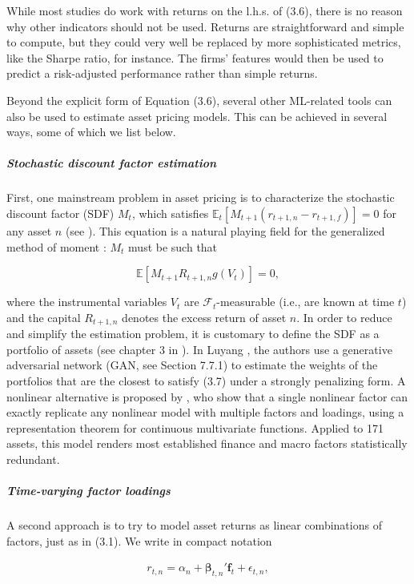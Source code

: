 While most studies do work with returns on the l.h.s. of (3.6), there is no reason why other indicators should not be used. Returns are straightforward and simple to compute, but they could very well be replaced by more sophisticated metrics, like the Sharpe ratio, for instance. The firms' features would then be used to predict a risk-adjusted performance rather than simple returns.

Beyond the explicit form of Equation (3.6), several other ML-related tools can also be used to estimate asset pricing models. This can be achieved in several ways, some of which we list below.

\subparagraph{Stochastic discount factor estimation}

First, one mainstream problem in asset pricing is to characterize the stochastic discount factor (SDF) $M_t$, which satisfies $\mathbb{E}_t[M_{t+1}(r_{t+1,n} -r_{t+1,f})]=0$ for any asset $n$ (see \cite{cochrane2009asset}). This equation is a natural playing field for the generalized method of moment \citep{hansen1982large}: $M_t$ must be such that

\begin{equation}
\label{GMM_SDF}
\mathbb{E}[M_{t+1}R_{t+1,n}g(V_t)]=0,
\end{equation}

where the instrumental variables $V_t$ are $\mathcal{F}_t$-measurable (i.e., are known at time $t$) and the capital $R_{t+1,n}$ denotes the excess return of asset $n$. In order to reduce and simplify the estimation problem, it is customary to define the SDF as a portfolio of assets (see chapter 3 in \cite{back2010asset}). In Luyang \cite{chen2020publication}, the authors use a generative adversarial network (GAN, see Section 7.7.1) to estimate the weights of the portfolios that are the closest to satisfy (3.7) under a strongly penalizing form. A nonlinear alternative is proposed by \cite{borri2024one}, who show that a single nonlinear factor can exactly replicate any nonlinear model with multiple factors and loadings, using a representation theorem for continuous multivariate functions. Applied to 171 assets, this model renders most established finance and macro factors statistically redundant.

\subparagraph{Time-varying factor loadings}

A second approach is to try to model asset returns as linear combinations of factors, just as in (3.1). We write in compact notation

\begin{align*}
r_{t,n}=\alpha_n+\boldsymbol{\beta}_{t,n}'\textbf{f}_t+\epsilon_{t,n},
\end{align*}

